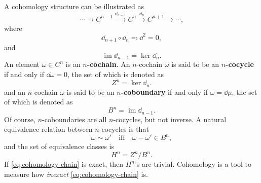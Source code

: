 \documentclass[hyperref, a4paper]{article}
\newcommand*{\concept}[1]{{\textbf{#1}}}
\DeclareMathOperator{\im}{im}
\begin{document}
A cohomology structure can be illustrated as 
\begin{equation}
    \cdots \to C^{n-1} \stackrel{\dd_{n-1}}{\longrightarrow} C^n \stackrel{\dd_n}{\longrightarrow} C^{n+1} \to \cdots ,
    \label{eq:cohomology-chain}
\end{equation}
where 
\begin{equation}
    \dd_{n+1} \circ \dd_n \eqqcolon \dd^2 = 0,
\end{equation} 
and 
\begin{equation}
    \im \dd_{n-1} = \ker \dd_n.
\end{equation}
An element $\omega \in C^{n}$ is an \concept{$n$-cochain}. An $n$-cochain $\omega$ is said to be an 
\concept{$n$-cocycle} if and only if $\dd{\omega} = 0$, the set of which is denoted as
\begin{equation}
    Z^n = \ker \dd_n.
\end{equation}
and an $n$-cochain $\omega$ is said to be an 
\concept{$n$-coboundary} if and only if $\omega = \dd{\mu}$, the set of which is denoted as 
\begin{equation}
    B^n = \im \dd_{n-1}.
\end{equation}
Of course, $n$-coboundaries are all 
$n$-cocycles, but not inverse. A natural equivalence relation between $n$-cocycles is that 
\begin{equation}
    \omega \sim \omega' \quad \text{iff} \quad \omega - \omega' \in B^n,
\end{equation}
and the set of equivalence classes is 
\begin{equation}
    H^n = Z^n / B^n.
\end{equation}
If \eqref{eq:cohomology-chain} is exact, then $H^n$'s are trivial. Cohomology is a tool to measure how 
\emph{inexact} \eqref{eq:cohomology-chain} is.
\end{document}
